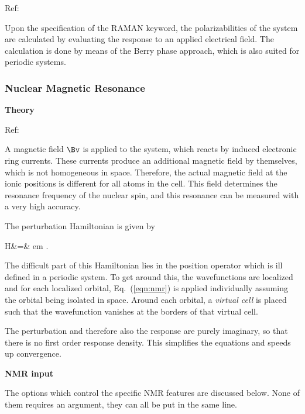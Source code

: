 \documentclass[twoside,10pt,titlepage,a4paper]{article}
\begin{document}
Ref: \cite{apmp}

Upon the specification of the RAMAN keyword, the polarizabilities of
the system are calculated by evaluating the response to an applied
electrical field. The calculation is done by means of the Berry phase
approach, which is also suited for periodic systems.




\subsubsection{Nuclear Magnetic Resonance}
\textbf{Theory}

Ref: \cite{dsmp}

A magnetic field $\Bv$ is applied to the system, which reacts by
induced electronic ring currents. These currents produce an additional
magnetic field by themselves, which is not homogeneous in
space. Therefore, the actual magnetic field at the ionic positions is
different for all atoms in the cell. This field determines the
resonance frequency of the nuclear spin, and this resonance can be
measured with a very high accuracy.

The perturbation Hamiltonian is given by

\beq
  H\one &=&  \frac em \pv \times \rv \cdot \Bv.
\label{eqn:nmr}
\eeq

The difficult part of this Hamiltonian lies in the position operator
which is ill defined in a periodic system. To get around this, the
wavefunctions are localized and for each localized orbital,
Eq.~(\ref{eqn:nmr}) is applied individually assuming the orbital being
isolated in space. Around each orbital, a \textsl{virtual cell} is
placed such that the wavefunction vanishes at the borders of that
virtual cell.


The perturbation and therefore also the response are purely imaginary,
so that there is no first order response density. This simplifies the
equations and speeds up convergence.


\textbf{NMR input}

The options which control the specific NMR features are discussed
below. None of them requires an argument, they can all be put in the
same line.
\end{document}
